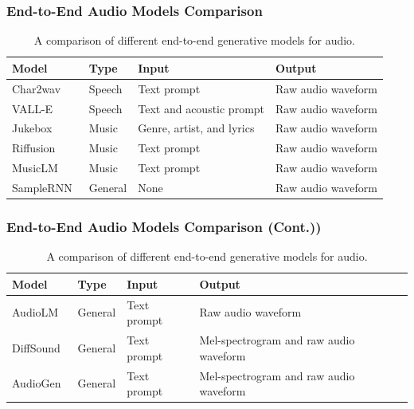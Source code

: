 \begin{frame}
    \frametitle{End-to-End Audio Models Comparison}

    \begin{table}[ht]
        \centering
        \caption{A comparison of different end-to-end generative models for audio.}
        \begin{tabularx}{\textwidth}{|X|l|X|X|}
            \hline
            \textbf{Model}                           & \textbf{Type} & \textbf{Input}            & \textbf{Output}    \\ \hline
            Char2wav~\cite{sotelo_char2wav_2017}     & Speech        & Text prompt               & Raw audio waveform \\ \hline
            VALL-E~\cite{wang_neural_2023}           & Speech        & Text and acoustic prompt  & Raw audio waveform \\ \hline
            Jukebox~\cite{dhariwal_jukebox_2020}     & Music         & Genre, artist, and lyrics & Raw audio waveform \\ \hline
            Riffusion~\cite{forsgren_riffusion_2022} & Music         & Text prompt               & Raw audio waveform \\ \hline
            MusicLM~\cite{agostinelli_musiclm_2023}  & Music         & Text prompt               & Raw audio waveform \\ \hline
            SampleRNN~\cite{mehri_samplernn_2017}    & General       & None                      & Raw audio waveform \\ \hline
        \end{tabularx}
        \label{tab:end-to-end-audio-models}
    \end{table}
\end{frame}

\begin{frame}
    \frametitle{End-to-End Audio Models Comparison (Cont.))}

    \begin{table}[ht]
        \centering
        \caption{A comparison of different end-to-end generative models for audio.}
        \begin{tabularx}{\textwidth}{|X|l|X|X|}
            \hline
            \textbf{Model}                       & \textbf{Type} & \textbf{Input} & \textbf{Output}                        \\ \hline
            AudioLM~\cite{borsos_audiolm_2022}   & General       & Text prompt    & Raw audio waveform                     \\ \hline
            DiffSound~\cite{yang_diffsound_2022} & General       & Text prompt    & Mel-spectrogram and raw audio waveform \\ \hline
            AudioGen~\cite{kreuk_audiogen_2023}  & General       & Text prompt    & Mel-spectrogram and raw audio waveform \\ \hline
        \end{tabularx}
    \end{table}
\end{frame}

